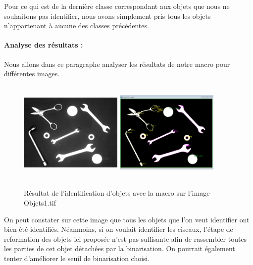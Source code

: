 \documentclass{scrreprt}
\begin{document}
Pour ce qui est de la dernière classe correspondant aux objets que nous ne souhaitons
pas identifier, nous avons simplement pris tous les objets n'appartenant à aucune des classes
précédentes.

\newpage
\paragraph{Analyse des résultats :}
 
Nous allons dans ce paragraphe analyser les résultats de notre macro pour différentes images.

\begin{figure}[!h]
\centering
\includegraphics[width=5cm, height=5cm]{images/objet1o.png}\hfill
\includegraphics[width=5cm, height=5cm]{images/objet1.png}
\caption{Résultat de l'identification d'objets avec la macro sur l'image Objets1.tif}
\end{figure}

On peut constater sur cette image que tous les objets que l'on veut identifier ont bien 
été identifiés. Néanmoins, si on voulait identifier les ciseaux, l'étape de reformation 
des objets ici proposée n'est pas suffisante afin de rassembler toutes les parties de cet
objet détachées par la binarisation. On pourrait également tenter d'améliorer le seuil 
de binarisation choisi.  
\end{document}
